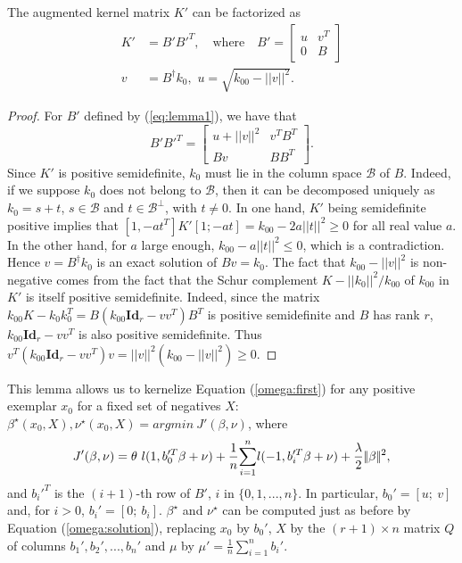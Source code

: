 \begin{lemma} The augmented kernel matrix $K'$ can be factorized as
\begin{align}
K'&= B'B'^T,\quad\text{where}\quad
B'=\begin{bmatrix}
u & v^T\\0 & B
\end{bmatrix}\\
v&=B^\dagger k_0,\,\, u=\sqrt{k_{00}-||v||^2}.\label{eq:lemma1}
\end{align}
\end{lemma}\label{lemma1}
\begin{proof}
For $B'$ defined by (\ref{eq:lemma1}), we have that 
\begin{equation}
B'B'^T = \begin{bmatrix} u+|\!|v|\!|^2 & v^TB^T\\ 
Bv& BB^T\end{bmatrix}.
\end{equation}
Since $K'$ is positive semidefinite, $k_0$ must lie in the column space $\mathcal{B}$ of $B$.
Indeed, if we suppose $k_0$ does not belong to $\mathcal{B}$, then it can be decomposed uniquely as $k_0=s+t$, $s\in\mathcal{B}$ and  $t\in\mathcal{B}^\perp$, with $t\ne 0$. In one hand, $K'$ being semidefinite positive implies that $[1, -at^T]K'[1; -at]=k_{00}-2a||t||^2\ge 0$ for all real value $a$. In the other hand, for $a$ large enough, $k_{00}-a||t||^2\le 0$, which is a contradiction.
Hence $v=B^\dagger k_0$ is an exact solution of $Bv=k_0$. The fact that $k_{00}-|\!|v|\!|^2$ is non-negative comes from the fact that the Schur complement $K-|\!|k_0|\!|^2/k_{00}$ of $k_{00}$ in $K'$ is itself positive semidefinite.
Indeed, since the matrix $k_{00}K-k_0k_0^T=B(k_{00}\textbf{Id}_r-vv^T)B^T$ is positive semidefinite and $B$ has rank $r$, $k_{00}\textbf{Id}_r-vv^T$ is also positive semidefinite. Thus $v^T(k_{00}\textbf{Id}_r-vv^T)v = ||v||^2(k_{00}-||v||^2)\ge 0$.
\end{proof}
This lemma allows us to kernelize Equation (\ref{omega:first}) for any positive exemplar $x_0$ for a fixed set of negatives $X$:
$\beta^\star(x_0,X), \nu^\star(x_0,X) = argmin \ J'(\beta, \nu)$, where
\begin{align}
J'(\beta, \nu)=
 \theta\ l(1, b_0'^T\beta+\nu) +\dfrac{1}{n}\displaystyle{\sum_{i=1}^n} l(-1,b_i'^T\beta+\nu)
+\dfrac{\lambda}{2}|\!|\beta|\!|^2,\label{beta:final}
\end{align}
and $b_i'^T$ is the $(i+1)$-th row of $B'$, $i$ in $\{0,1,...,n\}$. In particular, $b_0'=[u; \ v]$ and, for $i>0$, $b_i'=[0; \ b_i]$. $\beta^\star$ and $\nu^\star$ can be computed just as before by Equation (\ref{omega:solution}), replacing $x_0$ by $b_0'$, $X$ by the $(r+1)\times n$ matrix $Q$ of columns $b_1', b_2',...,b_n'$ and $\mu$ by $\mu' = \frac{1}{n}\sum_{i=1}^n b_i'$.


